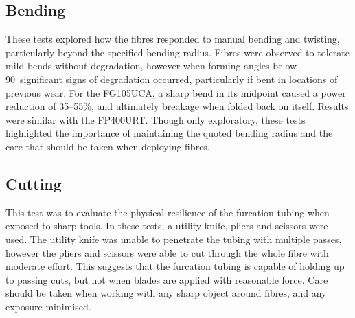 \documentclass[a4paper,11pt]{article}
\begin{document}
\subsection{Bending}
These tests explored how the fibres responded to manual bending and twisting, particularly beyond the specified bending radius. Fibres were observed to tolerate mild bends without degradation, however when forming angles below 90\degree\ significant signs of degradation occurred, particularly if bent in locations of previous wear. For the FG105UCA, a sharp bend in its midpoint caused a power reduction of 35--55\%, and ultimately breakage when folded back on itself. Results were similar with the FP400URT. Though only exploratory, these tests highlighted the importance of maintaining the quoted bending radius and the care that should be taken when deploying fibres.

\subsection{Cutting}
This test was to evaluate the physical resilience of the furcation tubing when exposed to sharp tools. In these tests, a utility knife, pliers and scissors were used. The utility knife was unable to penetrate the tubing with multiple passes, however the pliers and scissors were able to cut through the whole fibre with moderate effort. This suggests that the furcation tubing is capable of holding up to passing cuts, but not when blades are applied with reasonable force. Care should be taken when working with any sharp object around fibres, and any exposure minimised.
\end{document}
